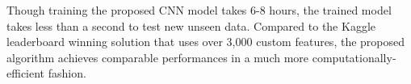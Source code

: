\documentclass[journal]{IEEEtran}
\begin{document}
Though training the proposed CNN model takes 6-8 hours, the trained model takes less than a second to test new unseen data. Compared to the Kaggle leaderboard winning solution that uses over 3,000 custom features, the proposed algorithm achieves comparable performances in a much more computationally-efficient fashion.











\end{document}
